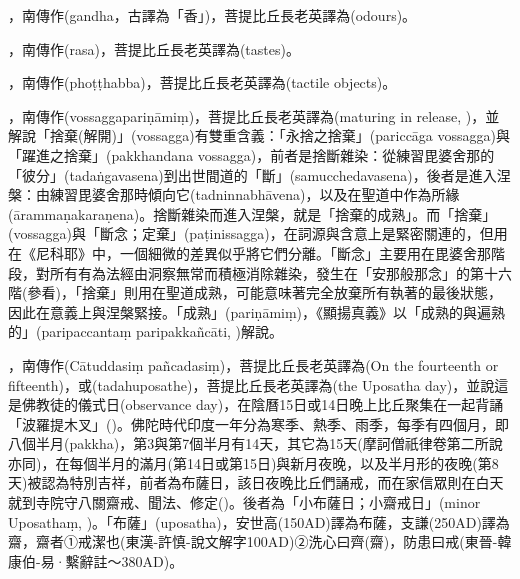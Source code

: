 \startitemgroup[noteitems]
\item{}，南傳作(gandha，古譯為「香」)，菩提比丘長老英譯為(odours)。
\item{}，南傳作(rasa)，菩提比丘長老英譯為(tastes)。
\item{}，南傳作(phoṭṭhabba)，菩提比丘長老英譯為(tactile objects)。
\stopitemgroup

\startitemgroup[noteitems]
\item{}，南傳作(vossaggapariṇāmiṃ)，菩提比丘長老英譯為(maturing in release, )，並解說「捨棄(解開)」(vossagga)有雙重含義：「永捨之捨棄」(pariccāga vossagga)與「躍進之捨棄」(pakkhandana vossagga)，前者是捨斷雜染：從練習毘婆舍那的「彼分」(tadaṅgavasena)到出世間道的「斷」(samucchedavasena)，後者是進入涅槃：由練習毘婆舍那時傾向它(tadninnabhāvena)，以及在聖道中作為所緣(ārammaṇakaraṇena)。捨斷雜染而進入涅槃，就是「捨棄的成熟」。而「捨棄」(vossagga)與「斷念；定棄」(paṭinissagga)，在詞源與含意上是緊密關連的，但用在《尼科耶》中，一個細微的差異似乎將它們分離。「斷念」主要用在毘婆舍那階段，對所有有為法經由洞察無常而積極消除雜染，發生在「安那般那念」的第十六階(參看)，「捨棄」則用在聖道成熟，可能意味著完全放棄所有執著的最後狀態，因此在意義上與涅槃緊接。「成熟」(pariṇāmiṃ)，《顯揚真義》以「成熟的與遍熟的」(paripaccantaṃ paripakkañcāti, )解說。
\stopitemgroup

\startitemgroup[noteitems]
\item{}，南傳作(Cātuddasiṃ pañcadasiṃ)，菩提比丘長老英譯為(On the fourteenth or fifteenth)，或(tadahuposathe)，菩提比丘長老英譯為(the Uposatha day)，並說這是佛教徒的儀式日(observance day)，在陰曆15日或14日晚上比丘聚集在一起背誦「波羅提木叉」()。佛陀時代印度一年分為寒季、熱季、雨季，每季有四個月，即八個半月(pakkha)，第3與第7個半月有14天，其它為15天(摩訶僧祇律卷第二所說亦同)，在每個半月的滿月(第14日或第15日)與新月夜晚，以及半月形的夜晚(第8天)被認為特別吉祥，前者為布薩日，該日夜晚比丘們誦戒，而在家信眾則在白天就到寺院守八關齋戒、聞法、修定()。後者為「小布薩日；小齋戒日」(minor Uposathaṃ, )。「布薩」(uposatha)，安世高(150AD)譯為布薩，支謙(250AD)譯為齋，齋者①戒潔也(東漢-許慎-說文解字100AD)②洗心曰齊(齋)，防患曰戒(東晉-韓康伯-易·繫辭註～380AD)。
\stopitemgroup

